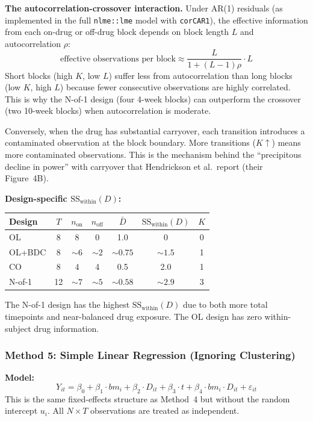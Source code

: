 \documentclass[11pt]{article}
\begin{document}
\textbf{The autocorrelation-crossover interaction.} Under AR(1)
residuals (as implemented in the full \texttt{nlme::lme} model with
\texttt{corCAR1}), the effective information from each on-drug or
off-drug block depends on block length $L$ and autocorrelation $\rho$:
\[
\text{effective observations per block} \approx
\frac{L}{1 + (L-1)\rho} \cdot L
\]
Short blocks (high $K$, low $L$) suffer less from autocorrelation than
long blocks (low $K$, high $L$) because fewer consecutive observations
are highly correlated. This is why the N-of-1 design (four 4-week
blocks) can outperform the crossover (two 10-week blocks) when
autocorrelation is moderate.

Conversely, when the drug has substantial carryover, each transition
introduces a contaminated observation at the block boundary. More
transitions ($K \uparrow$) means more contaminated observations. This
is the mechanism behind the ``precipitous decline in power'' with
carryover that Hendrickson et al.\ report (their Figure~4B).

\textbf{Design-specific $\text{SS}_{\text{within}}(D)$:}

\begin{table}[h]
\centering
\begin{tabular}{@{}lcccccc@{}}
\toprule
Design & $T$ & $n_{\text{on}}$ & $n_{\text{off}}$ & $\bar{D}$ &
$\text{SS}_{\text{within}}(D)$ & $K$ \\
\midrule
OL & 8 & 8 & 0 & 1.0 & 0 & 0 \\
OL+BDC & 8 & ${\sim}6$ & ${\sim}2$ & ${\sim}0.75$ & ${\sim}1.5$ & 1 \\
CO & 8 & 4 & 4 & 0.5 & 2.0 & 1 \\
N-of-1 & 12 & ${\sim}7$ & ${\sim}5$ & ${\sim}0.58$ & ${\sim}2.9$ & 3 \\
\bottomrule
\end{tabular}
\end{table}

The N-of-1 design has the highest $\text{SS}_{\text{within}}(D)$ due to
both more total timepoints and near-balanced drug exposure. The OL
design has zero within-subject drug information.

\subsubsection{Method 5: Simple Linear Regression (Ignoring Clustering)}

\textbf{Model:}
\[
Y_{it} = \beta_0 + \beta_1 \cdot bm_i + \beta_2 \cdot D_{it}
+ \beta_3 \cdot t + \beta_4 \cdot bm_i \cdot D_{it}
+ \varepsilon_{it}
\]
This is the same fixed-effects structure as Method~4 but without the
random intercept $u_i$. All $N \times T$ observations are treated as
independent.
\end{document}
